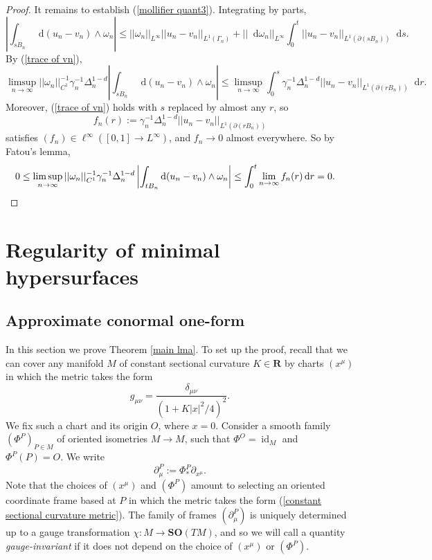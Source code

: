 \documentclass[reqno,10pt]{amsart}
\newcommand{\RR}{\mathbf{R}}
\newcommand{\SpOrth}{\mathbf{SO}}
\DeclareMathOperator{\id}{id}
\newcommand*\dif{\mathop{}\!\mathrm{d}}
\newcommand{\dfn}[1]{\emph{#1}\index{#1}}
\theoremstyle{definition}
\numberwithin{equation}{section}
\begin{document}
\begin{proof}
It remains to establish (\ref{mollifier quant3}).
Integrating by parts,
$$\left|\int_{sB_n} \dif (u_n - v_n) \wedge \omega_n\right| \leq ||\omega_n||_{L^\infty} ||u_n - v_n||_{L^1(\Gamma_n)} + ||\dif \omega_n||_{L^\infty} \int_0^t ||u_n - v_n||_{L^1(\partial(sB_n))} \dif s.$$
By (\ref{trace of vn}),
$$\limsup_{n \to \infty} ||\omega_n||_{C^1}^{-1} \gamma_n^{-1} \Delta_n^{1 - d} \left|\int_{sB_n} \dif(u_n - v_n) \wedge \omega_n\right| \leq \limsup_{n \to \infty} \int_0^s \gamma_n^{-1} \Delta_n^{1 - d} ||u_n - v_n||_{L^1(\partial(rB_n))} \dif r.$$
Moreover, (\ref{trace of vn}) holds with $s$ replaced by almost any $r$, so
$$f_n(r) := \gamma_n^{-1} \Delta_n^{1 - d} ||u_n - v_n||_{L^1(\partial(rB_n))}$$
satisfies $(f_n) \in \ell^\infty([0, 1] \to L^\infty)$, and $f_n \to 0$ almost everywhere.
So by Fatou's lemma,
\begin{align*}
0 \leq \limsup_{n \to \infty} ||\omega_n||_{C^1}^{-1} \gamma_n^{-1} \Delta_n^{1 - d} \left|\int_{tB_n} \dif(u_n - v_n) \wedge \omega_n\right| &\leq \int_0^t \lim_{n \to \infty} f_n(r) \dif r = 0. \qedhere
\end{align*}
\end{proof}


\section{Regularity of minimal hypersurfaces}\label{Plateau section}
\subsection{Approximate conormal one-form}
In this section we prove Theorem \ref{main lma}.
To set up the proof, recall that we can cover any manifold $M$ of constant sectional curvature $K \in \RR$ by charts $(x^\mu)$ in which the metric takes the form 
\begin{equation}\label{constant sectional curvature metric}
g_{\mu\nu} = \frac{\delta_{\mu\nu}}{(1 + K|x|^2/4)^2}.
\end{equation}
We fix such a chart and its origin $O$, where $x = 0$.
Consider a smooth family $(\Phi^P)_{P \in M}$ of oriented isometries $M \to M$, such that $\Phi^O = \id_M$ and $\Phi^P(P) = O$.
We write 
$$\partial^P_\mu := \Phi^P_* \partial_{x^\mu}.$$
Note that the choices of $(x^\mu)$ and $(\Phi^P)$ amount to selecting an oriented coordinate frame based at $P$ in which the metric takes the form (\ref{constant sectional curvature metric}).
The family of frames $(\partial^P_\mu)$ is uniquely determined up to a gauge transformation $\chi: M \to \SpOrth(TM)$, and so we will call a quantity \dfn{gauge-invariant} if it does not depend on the choice of $(x^\mu)$ or $(\Phi^P)$.
\end{document}
